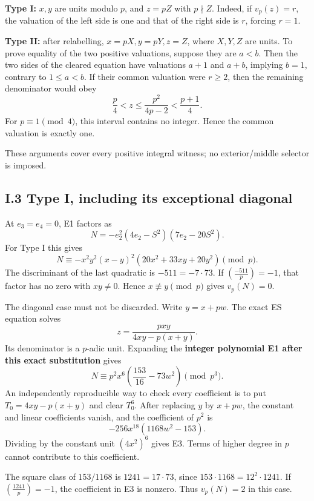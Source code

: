 \textbf{Type I:} \(x,y\) are units modulo \(p\), and \(z=pZ\) with
\(p\nmid Z\). Indeed, if \(v_p(z)=r\), the valuation of the left side is
one and that of the right side is \(r\), forcing \(r=1\).

\textbf{Type II:} after relabelling, \(x=pX,y=pY,z=Z\), where \(X,Y,Z\)
are units. To prove equality of the two positive valuations, suppose
they are \(a<b\). Then the two sides of the cleared equation have
valuations \(a+1\) and \(a+b\), implying \(b=1\), contrary to
\(1\le a<b\). If their common valuation were \(r\ge2\), then the
remaining denominator would obey \[
\frac p4<z\le \frac{p^2}{4p-2}<\frac{p+1}{4}.
\] For \(p\equiv1\pmod4\), this interval contains no integer. Hence the
common valuation is exactly one.

These arguments cover every positive integral witness; no
exterior/middle selector is imposed.

\subsection{I.3 Type I, including its exceptional
diagonal}\label{i.3-type-i-including-its-exceptional-diagonal}

At \(e_3=e_4=0\), E1 factors as \[
N=-e_2^2(4e_2-S^2)(7e_2-20S^2).
\] For Type I this gives \[
N\equiv-x^2y^2(x-y)^2(20x^2+33xy+20y^2)\pmod p.
\tag{E2}
\] The discriminant of the last quadratic is \(-511=-7\cdot73\). If
\(\left(\frac{-511}{p}\right)=-1\), that factor has no zero with
\(xy\ne0\). Hence \(x\not\equiv y\pmod p\) gives \(v_p(N)=0\).

The diagonal case must not be discarded. Write \(y=x+pw\). The exact ES
equation solves \[
z=\frac{pxy}{4xy-p(x+y)}.
\] Its denominator is a \(p\)-adic unit. Expanding the \textbf{integer
polynomial E1 after this exact substitution} gives \[
N\equiv p^2x^6\left(\frac{153}{16}-73w^2\right)\pmod {p^3}.
\tag{E3}
\] An independently reproducible way to check every coefficient is to
put \(T_0=4xy-p(x+y)\) and clear \(T_0^6\). After replacing \(y\) by
\(x+pw\), the constant and linear coefficients vanish, and the
coefficient of \(p^2\) is \[
-256x^{18}(1168w^2-153).
\] Dividing by the constant unit \((4x^2)^6\) gives E3. Terms of higher
degree in \(p\) cannot contribute to this coefficient.

The square class of \(153/1168\) is \(1241=17\cdot73\), since
\(153\cdot1168=12^2\cdot1241\). If \(\left(\frac{1241}{p}\right)=-1\),
the coefficient in E3 is nonzero. Thus \(v_p(N)=2\) in this case.


